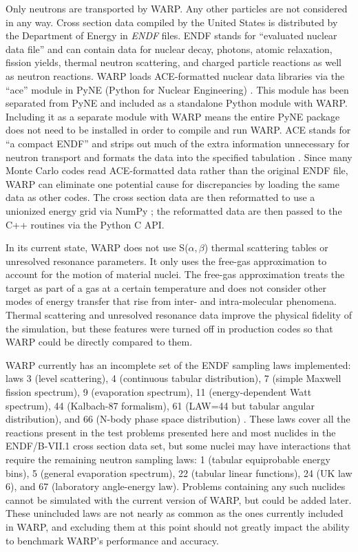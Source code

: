 \documentclass[preprint,12pt]{elsarticle}
\begin{document}
Only neutrons are transported by WARP.  Any other particles are not considered in any way.  Cross section data compiled by the United States is distributed by the Department of Energy in \emph{ENDF} files.  ENDF stands for ``evaluated nuclear data file'' and can contain data for nuclear decay, photons, atomic relaxation, fission yields, thermal neutron scattering, and charged particle reactions as well as neutron reactions.   WARP loads ACE-formatted nuclear data libraries via the ``ace'' module in PyNE (Python for Nuclear Engineering) \cite{pyne}.  This module has been separated from PyNE and included as a standalone Python module with WARP.  Including it as a separate module with WARP means the entire PyNE package does not need to be installed in order to compile and run WARP.  ACE stands for ``a compact ENDF'' and strips out much of the extra information unnecessary for neutron transport and formats the data into the specified tabulation \cite{endfnums}.  Since many Monte Carlo codes read ACE-formatted data rather than the original ENDF file, WARP can eliminate one potential cause for discrepancies by loading the same data as other codes.  The cross section data are then reformatted to use a unionized energy grid via NumPy \cite{numpy}; the reformatted data are then passed to the C++ routines via the Python C API.

In its current state, WARP does not use S($\alpha,\beta$) thermal scattering tables or unresolved resonance parameters.  It only uses the free-gas approximation to account for the motion of material nuclei.  The free-gas approximation treats the target as part of a gas at a certain temperature and does not consider other modes of energy transfer that rise from inter- and intra-molecular phenomena.  Thermal scattering and unresolved resonance data improve the physical fidelity of the simulation, but these features were turned off in production codes so that WARP could be directly compared to them. 

WARP currently has an incomplete set of the ENDF sampling laws implemented: laws 3 (level scattering), 4 (continuous tabular distribution), 7 (simple Maxwell fission spectrum), 9 (evaporation spectrum), 11 (energy-dependent Watt spectrum), 44 (Kalbach-87 formalism), 61 (LAW=44 but tabular angular distribution), and 66 (N-body phase space distribution) \cite{MCNP}.  These laws cover all the reactions present in the test problems presented here and most nuclides in the ENDF/B-VII.1 cross section data set, but some nuclei may have interactions that require the remaining neutron sampling laws: 1 (tabular equiprobable energy bins), 5 (general evaporation spectrum), 22 (tabular linear functions), 24 (UK law 6), and 67 (laboratory angle-energy law).  Problems containing any such nuclides cannot be simulated with the current version of WARP, but could be added later.  These unincluded laws are not nearly as common as the ones currently included in WARP, and excluding them at this point should not greatly impact the ability to benchmark WARP's performance and accuracy.
\end{document}
